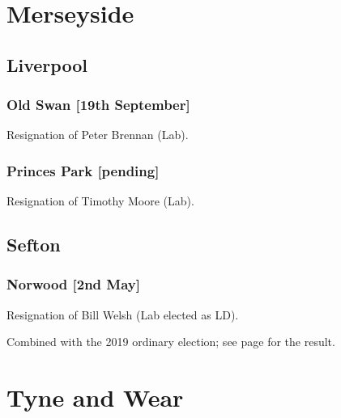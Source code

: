 \documentclass[a4paper,openany]{book}
\begin{document}
\begin{resultsiii}
\section{Merseyside}

\subsection*{Liverpool}

\subsubsection*{Old Swan \hspace*{\fill}\nolinebreak[1]%
	\enspace\hspace*{\fill}
	[19th September]}


Resignation of Peter Brennan (Lab).

\subsubsection*{Princes Park \hspace*{\fill}\nolinebreak[1]%
	\enspace\hspace*{\fill}
	[pending]}


Resignation of Timothy Moore (Lab).

\subsection*{Sefton}

\subsubsection*{Norwood \hspace*{\fill}\nolinebreak[1]%
	\enspace\hspace*{\fill}
	[2nd May]}


Resignation of Bill Welsh (Lab elected as LD).

Combined with the 2019 ordinary election; see page \pageref{SeftonNorwood} for the result.

\section{Tyne and Wear}


\end{resultsiii}
\end{document}
